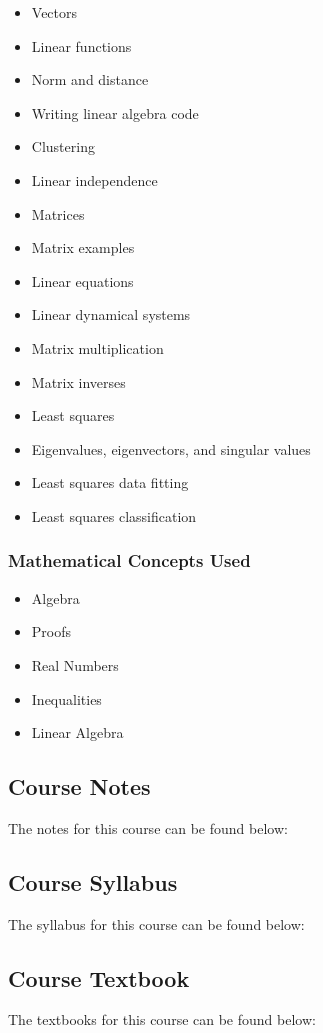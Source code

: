 {\begin{highlight}[\CSPBLA]
        \begin{itemize}
            \item Vectors
            \item Linear functions
            \item Norm and distance
            \item Writing linear algebra code
            \item Clustering
            \item Linear independence
            \item Matrices
            \item Matrix examples
            \item Linear equations
            \item Linear dynamical systems
            \item Matrix multiplication
            \item Matrix inverses
            \item Least squares
            \item Eigenvalues, eigenvectors, and singular values
            \item Least squares data fitting
            \item Least squares classification
        \end{itemize}
        
        \subsubsection*{Mathematical Concepts Used}
        
        \begin{itemize}
            \item Algebra
            \item Proofs
            \item Real Numbers
            \item Inequalities
            \item Linear Algebra
        \end{itemize}
    \end{highlight}
}

\subsection{Course Notes}

The notes for this course can be found below: \coursedoc{\CSPBLACourseNotes}

\subsection{Course Syllabus}

The syllabus for this course can be found below: \coursedoc{\CSPBLASyllabus}

\subsection{Course Textbook}

The textbooks for this course can be found below:

\coursedoc{\CSPBLAVMLSTextbook} \coursedoc{\CSPBLAVMLSSolutions} \coursedoc{\CSPBLAVMLSPyComp}